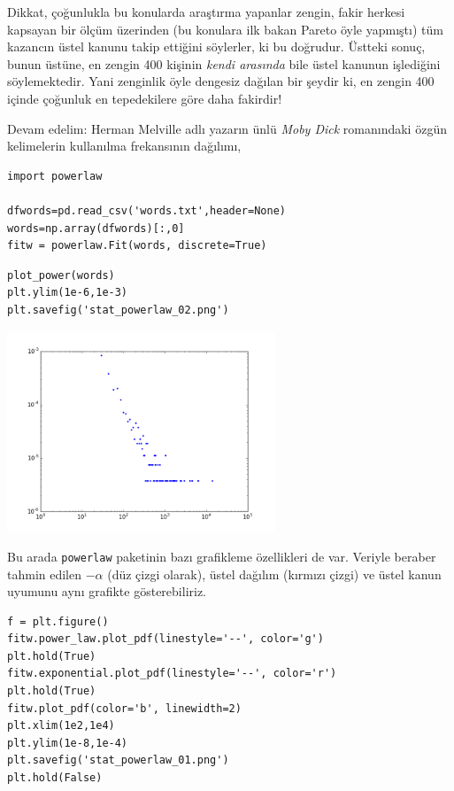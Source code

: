 \documentclass[12pt,fleqn]{article}\usepackage{../../common}
\begin{document}
Dikkat, çoğunlukla bu konularda araştırma yapanlar zengin, fakir herkesi
kapsayan bir ölçüm üzerinden (bu konulara ilk bakan Pareto öyle yapmıştı)
tüm kazancın üstel kanunu takip ettiğini söylerler, ki bu doğrudur. Üstteki
sonuç, bunun üstüne, en zengin 400 kişinin {\em kendi arasında} bile üstel
kanunun işlediğini söylemektedir. Yani zenginlik öyle dengesiz dağılan bir
şeydir ki, en zengin 400 içinde çoğunluk en tepedekilere göre daha
fakirdir!

Devam edelim: Herman Melville adlı yazarın ünlü {\em Moby Dick} romanındaki
özgün kelimelerin kullanılma frekansının dağılımı,

\begin{verbatim}
import powerlaw

dfwords=pd.read_csv('words.txt',header=None)
words=np.array(dfwords)[:,0]
fitw = powerlaw.Fit(words, discrete=True)
\end{verbatim}

\begin{verbatim}
plot_power(words)
plt.ylim(1e-6,1e-3)
plt.savefig('stat_powerlaw_02.png')
\end{verbatim}

\includegraphics[height=6cm]{stat_powerlaw_02.png}

Bu arada \verb!powerlaw! paketinin bazı grafikleme özellikleri de
var. Veriyle beraber tahmin edilen $-\alpha$ (düz çizgi olarak), üstel
dağılım (kırmızı çizgi) ve üstel kanun uyumunu aynı grafikte gösterebiliriz.

\begin{verbatim}
f = plt.figure()
fitw.power_law.plot_pdf(linestyle='--', color='g')
plt.hold(True)
fitw.exponential.plot_pdf(linestyle='--', color='r')
plt.hold(True)
fitw.plot_pdf(color='b', linewidth=2)
plt.xlim(1e2,1e4)
plt.ylim(1e-8,1e-4)
plt.savefig('stat_powerlaw_01.png')
plt.hold(False)
\end{verbatim}
\end{document}
